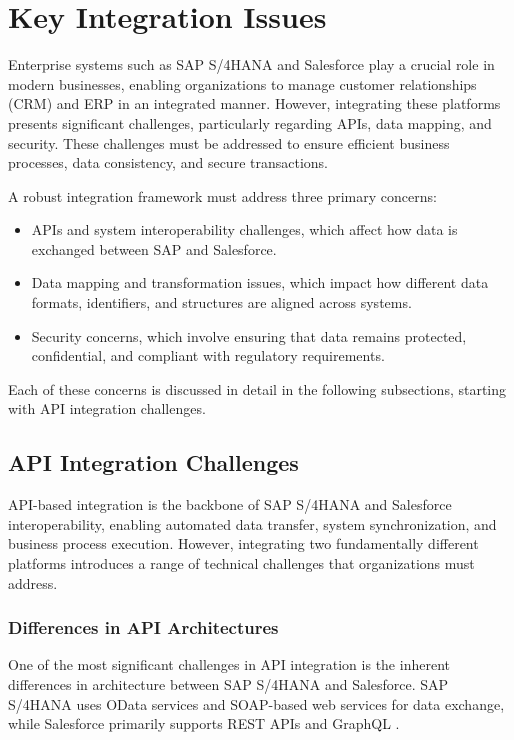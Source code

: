 \section{Key Integration Issues}

Enterprise systems such as SAP S/4HANA and Salesforce play a crucial role in modern businesses, enabling organizations to manage customer relationships (CRM) and ERP in an integrated manner. However, integrating these platforms presents significant challenges, particularly regarding APIs, data mapping, and security. These challenges must be addressed to ensure efficient business processes, data consistency, and secure transactions.

A robust integration framework must address three primary concerns:
\begin{itemize}
    \item APIs and system interoperability challenges, which affect how data is exchanged between SAP and Salesforce.
    \item Data mapping and transformation issues, which impact how different data formats, identifiers, and structures are aligned across systems.
    \item Security concerns, which involve ensuring that data remains protected, confidential, and compliant with regulatory requirements.
\end{itemize}

Each of these concerns is discussed in detail in the following subsections, starting with API integration challenges.

\subsection{API Integration Challenges}
API-based integration is the backbone of SAP S/4HANA and Salesforce interoperability, enabling automated data transfer, system synchronization, and business process execution. However, integrating two fundamentally different platforms introduces a range of technical challenges that organizations must address.

\subsubsection{Differences in API Architectures}
One of the most significant challenges in API integration is the inherent differences in architecture between SAP S/4HANA and Salesforce. SAP S/4HANA uses OData services and SOAP-based web services for data exchange, while Salesforce primarily supports REST APIs and GraphQL \cite{chinta2024}.

